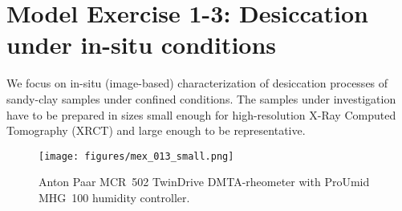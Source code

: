 \section[MEX 1-3: Desiccation under in-situ conditions]{Model Exercise 1-3: Desiccation under in-situ conditions}
\label{sec:mex12}

We focus on in-situ (image-based) characterization of desiccation processes of sandy-clay samples under confined conditions. The samples under investigation have to be prepared in sizes small enough for high-resolution X-Ray Computed Tomography (XRCT) and large enough to be representative.

\begin{figure}[ht!]
\centering
\texttt{[image: figures/mex\_013\_small.png]}
\caption{Anton Paar MCR~502 TwinDrive DMTA-rheometer with ProUmid MHG~100 humidity controller.}
\label{fig:env_chamber}
\end{figure}

